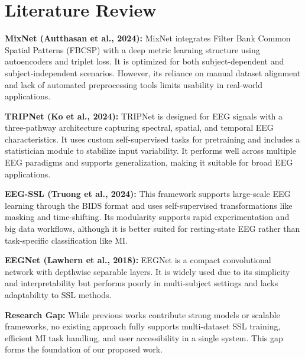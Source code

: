 \section{Literature Review}
\label{section:literature-review}

\textbf{MixNet (Autthasan et al., 2024):}
MixNet integrates Filter Bank Common Spatial Patterns (FBCSP) with a deep metric learning structure using autoencoders and triplet loss. It is optimized for both subject-dependent and subject-independent scenarios. However, its reliance on manual dataset alignment and lack of automated preprocessing tools limits usability in real-world applications.

\vspace{0.5em}
\textbf{TRIPNet (Ko et al., 2024):}
TRIPNet is designed for EEG signals with a three-pathway architecture capturing spectral, spatial, and temporal EEG characteristics. It uses custom self-supervised tasks for pretraining and includes a statistician module to stabilize input variability. It performs well across multiple EEG paradigms and supports generalization, making it suitable for broad EEG applications.

\vspace{0.5em}
\textbf{EEG-SSL (Truong et al., 2024):}
This framework supports large-scale EEG learning through the BIDS format and uses self-supervised transformations like masking and time-shifting. Its modularity supports rapid experimentation and big data workflows, although it is better suited for resting-state EEG rather than task-specific classification like MI.

\vspace{0.5em}
\textbf{EEGNet (Lawhern et al., 2018):}
EEGNet is a compact convolutional network with depthwise separable layers. It is widely used due to its simplicity and interpretability but performs poorly in multi-subject settings and lacks adaptability to SSL methods.

\vspace{0.5em}
\textbf{Research Gap:}
While previous works contribute strong models or scalable frameworks, no existing approach fully supports multi-dataset SSL training, efficient MI task handling, and user accessibility in a single system. This gap forms the foundation of our proposed work.

